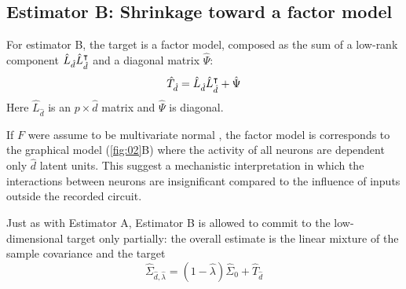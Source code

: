 
\subsection*{Estimator B: Shrinkage toward a factor model}
For estimator B, the target is a factor model, composed as the sum of a low-rank component $\hat L_{\hat d}\hat L_{\hat d}^\intercal$ and a diagonal matrix $\hat \Psi$:
\begin{equation}
\hat T_{\hat d} = \hat L_{\hat d} \hat L_{\hat d}^\intercal + \hat\Psi
\end{equation}
Here $\hat L_{\hat d}$ is an $p\times\hat d$ matrix and $\hat\Psi$ is diagonal.  

If $F$ were assume to be multivariate normal , the factor model is corresponds to the graphical model (\ref{fig:02}B) where the activity of all neurons are dependent only $\hat d$ latent units. This suggest a mechanistic interpretation in which the interactions between neurons are insignificant compared to the influence of inputs outside the recorded circuit.

Just as with Estimator A, Estimator B is allowed to commit to the low-dimensional target only partially: the overall estimate is the linear mixture of the sample covariance and the target
\begin{equation}
\hat\Sigma_{\hat d,\hat\lambda} = (1-\hat\lambda)\hat\Sigma_0 + \hat  T_{\hat d}
\end{equation}


